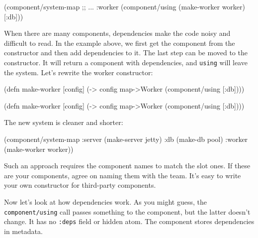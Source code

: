 \begin{english}
  \begin{clojure}
(component/system-map
 ;; ...
 :worker (component/using
          (make-worker worker) [:db]))
  \end{clojure}
\end{english}

When there are many components, dependencies make the code noisy and difficult to read. In the example above, we first get the component from the constructor and then add dependencies to it. The last step can be moved to the constructor. It will return a component with dependencies, and \verb|using| will leave the system. Let's rewrite the worker constructor:

\ifnarrow

\begin{english}
  \begin{clojure}
(defn make-worker [config]
  (-> config
      map->Worker
      (component/using [:db])))
  \end{clojure}
\end{english}

\else

\begin{english}
  \begin{clojure}
(defn make-worker [config]
  (-> config map->Worker (component/using [:db])))
  \end{clojure}
\end{english}

\fi

\noindent
The new system is cleaner and shorter:

\begin{english}
  \begin{clojure}
(component/system-map
 :server (make-server jetty)
 :db     (make-db pool)
 :worker (make-worker worker))
  \end{clojure}
\end{english}

Such an approach requires the component names to match the slot ones. If these are your components, agree on naming them with the team. It's easy to write your own constructor for third-party components.


Now let's look at how dependencies work. As you might guess, the \verb|component/using| call passes something to the component, but the latter doesn't change. It has no \verb|:deps| field or hidden atom. The component stores dependencies in metadata.

